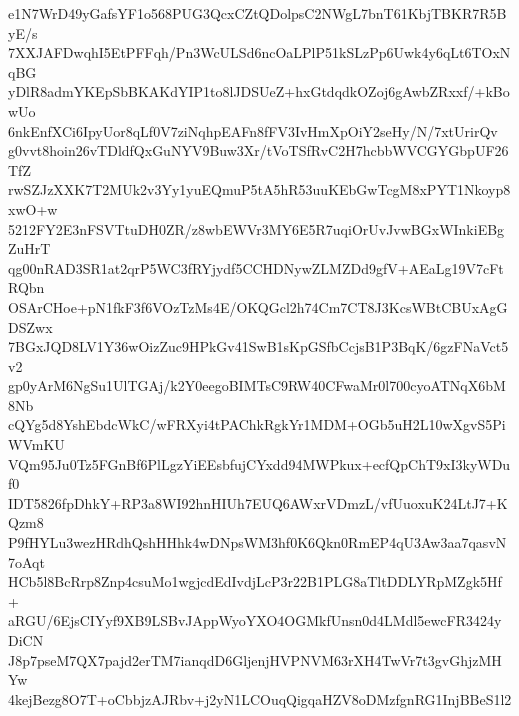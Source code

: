 e1N7WrD49yGafsYF1o568PUG3QcxCZtQDolpsC2NWgL7bnT61KbjTBKR7R5ByE/s
7XXJAFDwqhI5EtPFFqh/Pn3WcULSd6ncOaLPlP51kSLzPp6Uwk4y6qLt6TOxNqBG
yDlR8admYKEpSbBKAKdYIP1to8lJDSUeZ+hxGtdqdkOZoj6gAwbZRxxf/+kBowUo
6nkEnfXCi6IpyUor8qLf0V7ziNqhpEAFn8fFV3IvHmXpOiY2seHy/N/7xtUrirQv
g0vvt8hoin26vTDldfQxGuNYV9Buw3Xr/tVoTSfRvC2H7hcbbWVCGYGbpUF26TfZ
rwSZJzXXK7T2MUk2v3Yy1yuEQmuP5tA5hR53uuKEbGwTcgM8xPYT1Nkoyp8xwO+w
5212FY2E3nFSVTtuDH0ZR/z8wbEWVr3MY6E5R7uqiOrUvJvwBGxWInkiEBgZuHrT
qg00nRAD3SR1at2qrP5WC3fRYjydf5CCHDNywZLMZDd9gfV+AEaLg19V7cFtRQbn
OSArCHoe+pN1fkF3f6VOzTzMs4E/OKQGcl2h74Cm7CT8J3KcsWBtCBUxAgGDSZwx
7BGxJQD8LV1Y36wOizZuc9HPkGv41SwB1sKpGSfbCcjsB1P3BqK/6gzFNaVct5v2
gp0yArM6NgSu1UlTGAj/k2Y0eegoBIMTsC9RW40CFwaMr0l700cyoATNqX6bM8Nb
cQYg5d8YshEbdcWkC/wFRXyi4tPAChkRgkYr1MDM+OGb5uH2L10wXgvS5PiWVmKU
VQm95Ju0Tz5FGnBf6PlLgzYiEEsbfujCYxdd94MWPkux+ecfQpChT9xI3kyWDuf0
IDT5826fpDhkY+RP3a8WI92hnHIUh7EUQ6AWxrVDmzL/vfUuoxuK24LtJ7+KQzm8
P9fHYLu3wezHRdhQshHHhk4wDNpsWM3hf0K6Qkn0RmEP4qU3Aw3aa7qasvN7oAqt
HCb5l8BcRrp8Znp4csuMo1wgjcdEdIvdjLcP3r22B1PLG8aTltDDLYRpMZgk5Hf+
aRGU/6EjsCIYyf9XB9LSBvJAppWyoYXO4OGMkfUnsn0d4LMdl5ewcFR3424yDiCN
J8p7pseM7QX7pajd2erTM7ianqdD6GljenjHVPNVM63rXH4TwVr7t3gvGhjzMHYw
4kejBezg8O7T+oCbbjzAJRbv+j2yN1LCOuqQigqaHZV8oDMzfgnRG1InjBBeS1l2
